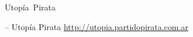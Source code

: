     \newpage
    \thispagestyle{empty}

    \begin{flushleft}\hbox{\Large{Utopía Pirata}}

    \vfill
    \copyleft  \the\year -- Utopía Pirata
    \url{http://utopia.partidopirata.com.ar}

    \end{flushleft}
   \newpage


